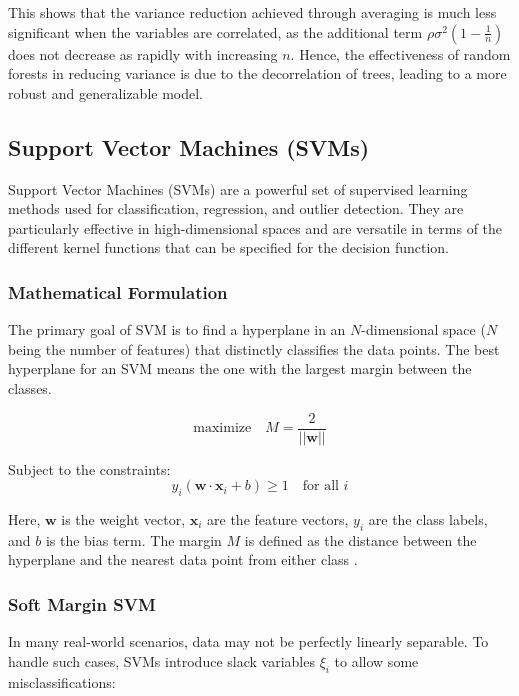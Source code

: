 \documentclass[english,11pt,a4paper,titlepage]{article}
\begin{document}
	This shows that the variance reduction achieved through averaging is much less significant when the variables are correlated, as the additional term \( \rho\sigma^2\left(1 - \frac{1}{n}\right) \) does not decrease as rapidly with increasing \( n \). Hence, the effectiveness of random forests in reducing variance is due to the decorrelation of trees, leading to a more robust and generalizable model.
	
	\subsection*{Support Vector Machines (SVMs)}
	Support Vector Machines (SVMs) are a powerful set of supervised learning methods used for classification, regression, and outlier detection. They are particularly effective in high-dimensional spaces and are versatile in terms of the different kernel functions that can be specified for the decision function.
	
	\subsubsection*{Mathematical Formulation}
	The primary goal of SVM is to find a hyperplane in an \( N \)-dimensional space (\( N \) being the number of features) that distinctly classifies the data points. The best hyperplane for an SVM means the one with the largest margin between the classes.
	
	\begin{equation*}
		\text{maximize} \quad M = \frac{2}{||\mathbf{w}||}
	\end{equation*}
	
	Subject to the constraints:
	\begin{equation*}
		y_i (\mathbf{w} \cdot \mathbf{x}_i + b) \geq 1 \quad \text{for all } i
	\end{equation*}
	
	Here, \( \mathbf{w} \) is the weight vector, \( \mathbf{x}_i \) are the feature vectors, \( y_i \) are the class labels, and \( b \) is the bias term. The margin \( M \) is defined as the distance between the hyperplane and the nearest data point from either class \cite{hastieElementsStatisticalLearning2009,cortesSupportvectorNetworks1995}. 
	
	\subsubsection*{Soft Margin SVM}
	In many real-world scenarios, data may not be perfectly linearly separable. To handle such cases, SVMs introduce slack variables \( \xi_i \) to allow some misclassifications:
	
\end{document}
